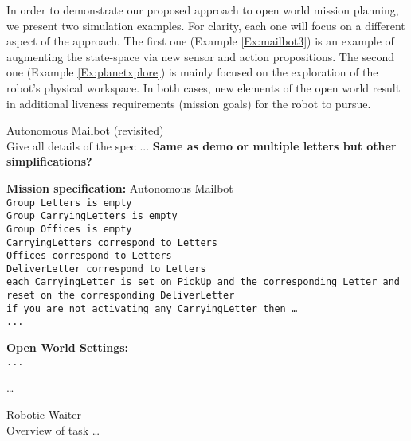 In order to demonstrate our proposed approach to open world mission planning, we present two simulation examples. For clarity, each one will focus on a different aspect of the approach. The first one (Example \ref{Ex:mailbot3}) is an example of augmenting the state-space via new sensor and action propositions. The second one (Example \ref{Ex:planetxplore}) is mainly focused on the exploration of the robot's physical workspace. In both cases, new elements of the open world result in additional liveness requirements (mission goals) for the robot to pursue.

\begin{myExample}\label{Ex:mailbot3} Autonomous Mailbot (revisited)\\
	Give all details of the spec ... \textbf{Same as demo or multiple letters but other simplifications?}
\end{myExample}

\begin{algorithm}
	\textbf{Mission specification:} Autonomous Mailbot\\
	{\small
	\texttt{Group Letters is empty}\\
	\texttt{Group CarryingLetters is empty}\\
	\texttt{Group Offices is empty}\\
	
	\texttt{CarryingLetters correspond to Letters}\\
	\texttt{Offices correspond to Letters}\\
	\texttt{DeliverLetter correspond to Letters}\\
	
	\texttt{each CarryingLetter is set on PickUp and the corresponding Letter and reset on the corresponding DeliverLetter}\\
	
	\texttt{if you are not activating any CarryingLetter then \ldots}\\
	\texttt{...}\\
	}
	
	\textbf{Open World Settings:}\\
	{\small
	\texttt{...} 
	}
\end{algorithm}

\ldots

\begin{myExample}\label{Ex:restaurant} Robotic Waiter \\
	Overview of task \ldots
\end{myExample}

